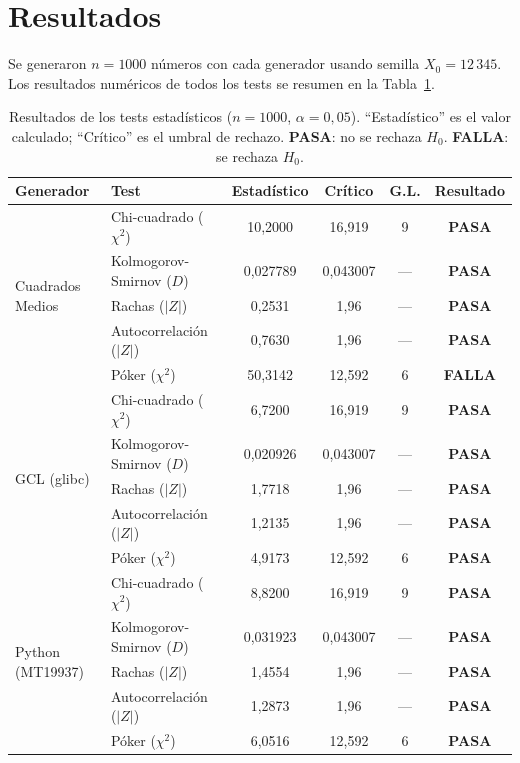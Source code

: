 \documentclass{article}
\begin{document}
\section{Resultados}

Se generaron $n=1000$ números con cada generador usando semilla
$X_0=12\,345$.  Los resultados numéricos de todos los tests se resumen en
la Tabla~\ref{tab:resultados}.

\begin{table}[H]
  \centering
  \caption{Resultados de los tests estadísticos ($n=1000$, $\alpha=0{,}05$).
           ``Estadístico'' es el valor calculado; ``Crítico'' es el umbral
           de rechazo.  \textbf{PASA}: no se rechaza $H_0$.  \textbf{FALLA}: se rechaza $H_0$.}
  \label{tab:resultados}
  \begin{tabular}{llcccc}
    \toprule
    Generador & Test & Estadístico & Crítico & G.L. & Resultado \\
    \midrule
    \multirow{5}{*}{Cuadrados Medios}
      & Chi-cuadrado ($\chi^2$)    & 10{,}2000  & 16{,}919  & 9  & \textbf{PASA}  \\
      & Kolmogorov-Smirnov ($D$)   & 0{,}027789 & 0{,}043007 & —  & \textbf{PASA}  \\
      & Rachas ($|Z|$)             & 0{,}2531   & 1{,}96    & —  & \textbf{PASA}  \\
      & Autocorrelación ($|Z|$)    & 0{,}7630   & 1{,}96    & —  & \textbf{PASA}  \\
      & Póker ($\chi^2$)           & 50{,}3142  & 12{,}592  & 6  & \textbf{FALLA} \\
    \midrule
    \multirow{5}{*}{GCL (glibc)}
      & Chi-cuadrado ($\chi^2$)    & 6{,}7200   & 16{,}919  & 9  & \textbf{PASA}  \\
      & Kolmogorov-Smirnov ($D$)   & 0{,}020926 & 0{,}043007 & —  & \textbf{PASA}  \\
      & Rachas ($|Z|$)             & 1{,}7718   & 1{,}96    & —  & \textbf{PASA}  \\
      & Autocorrelación ($|Z|$)    & 1{,}2135   & 1{,}96    & —  & \textbf{PASA}  \\
      & Póker ($\chi^2$)           & 4{,}9173   & 12{,}592  & 6  & \textbf{PASA}  \\
    \midrule
    \multirow{5}{*}{Python (MT19937)}
      & Chi-cuadrado ($\chi^2$)    & 8{,}8200   & 16{,}919  & 9  & \textbf{PASA}  \\
      & Kolmogorov-Smirnov ($D$)   & 0{,}031923 & 0{,}043007 & —  & \textbf{PASA}  \\
      & Rachas ($|Z|$)             & 1{,}4554   & 1{,}96    & —  & \textbf{PASA}  \\
      & Autocorrelación ($|Z|$)    & 1{,}2873   & 1{,}96    & —  & \textbf{PASA}  \\
      & Póker ($\chi^2$)           & 6{,}0516   & 12{,}592  & 6  & \textbf{PASA}  \\
    \bottomrule
  \end{tabular}
\end{table}
\end{document}
